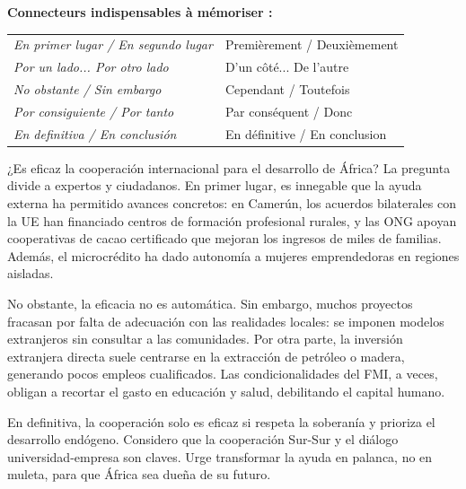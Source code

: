\documentclass[11pt]{article}
\newcommand{\esp}[1]{\ifmmode\text{\textit{#1}}\else\begingroup\selectlanguage{spanish}\itshape #1\endgroup\fi}
\begin{document}
\begin{methode}
\textbf{Connecteurs indispensables à mémoriser :}
\begin{center}
\begin{tabular}{|l|l|}
\hline
\esp{En primer lugar / En segundo lugar} & Premièrement / Deuxièmement \\
\esp{Por un lado... Por otro lado} & D'un côté... De l'autre \\
\esp{No obstante / Sin embargo} & Cependant / Toutefois \\
\esp{Por consiguiente / Por tanto} & Par conséquent / Donc \\
\esp{En definitiva / En conclusión} & En définitive / En conclusion \\
\hline
\end{tabular}
\end{center}
\end{methode}

\begin{textebox}
¿Es eficaz la cooperación internacional para el desarrollo de África? La pregunta divide a expertos y ciudadanos. En primer lugar, es innegable que la ayuda externa ha permitido avances concretos: en Camerún, los acuerdos bilaterales con la UE han financiado centros de formación profesional rurales, y las ONG apoyan cooperativas de cacao certificado que mejoran los ingresos de miles de familias. Además, el microcrédito ha dado autonomía a mujeres emprendedoras en regiones aisladas.

No obstante, la eficacia no es automática. Sin embargo, muchos proyectos fracasan por falta de adecuación con las realidades locales: se imponen modelos extranjeros sin consultar a las comunidades. Por otra parte, la inversión extranjera directa suele centrarse en la extracción de petróleo o madera, generando pocos empleos cualificados. Las condicionalidades del FMI, a veces, obligan a recortar el gasto en educación y salud, debilitando el capital humano.

En definitiva, la cooperación solo es eficaz si respeta la soberanía y prioriza el desarrollo endógeno. Considero que la cooperación Sur-Sur y el diálogo universidad-empresa son claves. Urge transformar la ayuda en palanca, no en muleta, para que África sea dueña de su futuro.
\end{textebox}
\end{document}
